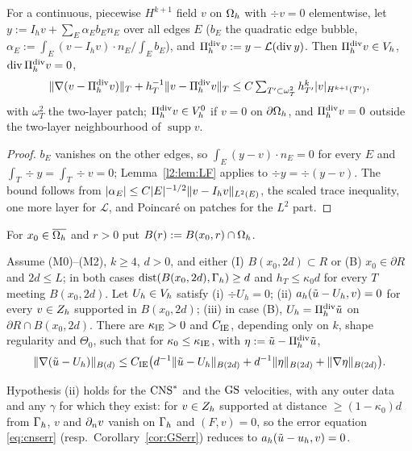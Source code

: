 \begin{lemma}\label{l2:lem:Pz}
For a continuous, piecewise $H^{k+1}$ field $v$ on $\Oh$ with $\div v=0$ elementwise, let $y:=I_hv+\sum_E\alpha_Eb_En_E$ over all edges $E$ ($b_E$ the quadratic edge bubble, $\alpha_E:=\int_E(v-I_hv)\cdot n_E/\int_Eb_E$), and $\Pi^{\rm div}_hv:=y-\mathcal L(\div y)$. Then $\Pi^{\rm div}_hv\in\Vh$, $\div\Pi^{\rm div}_hv=0$,
\[
\norm{\nabla(v-\Pi^{\rm div}_hv)}_T+h_T^{-1}\norm{v-\Pi^{\rm div}_hv}_T\le C\textstyle\sum_{T'\subset\omega^2_T}h_{T'}^k|v|_{H^{k+1}(T')},
\]
with $\omega^2_T$ the two-layer patch; $\Pi^{\rm div}_hv\in\VO$ if $v=0$ on $\partial\Oh$, and $\Pi^{\rm div}_hv=0$ outside the two-layer neighbourhood of $\operatorname{supp}v$.
\end{lemma}

\begin{proof}
$b_E$ vanishes on the other edges, so $\int_E(y-v)\cdot n_E=0$ for every $E$ and $\int_T\div y=\int_T\div v=0$; Lemma~\ref{l2:lem:LF} applies to $\div y=\div(y-v)$. The bound follows from $|\alpha_E|\le C|E|^{-1/2}\norm{v-I_hv}_{L^2(E)}$, the scaled trace inequality, one more layer for $\mathcal L$, and Poincar\'e on patches for the $L^2$ part.
\end{proof}

For $x_0\in\overline\Oh$ and $r>0$ put $B(r):=B(x_0,r)\cap\Oh$.

\begin{theorem}\label{l2:thm:IE}
Assume (M0)--(M2), $k\ge4$, $d>0$, and either (I) $B(x_0,2d)\subset R$ or (B) $x_0\in\partial R$ and $2d\le L$; in both cases $\dist(B(x_0,2d),\Gh)\ge d$ and $h_T\le\kappa_0d$ for every $T$ meeting $B(x_0,2d)$. Let $U_h\in\Vh$ satisfy (i) $\div U_h=0$; (ii) $a_h(\ut-U_h,v)=0$ for every $v\in\Zh$ supported in $B(x_0,2d)$; (iii) in case (B), $U_h=\Pi^{\rm div}_h\ut$ on $\partial R\cap B(x_0,2d)$. There are $\kappa_{\rm IE}>0$ and $C_{\rm IE}$, depending only on $k$, shape regularity and $\Theta_0$, such that for $\kappa_0\le\kappa_{\rm IE}$, with $\eta:=\ut-\Pi^{\rm div}_h\ut$,
\[
\norm{\nabla(\ut-U_h)}_{B(d)}\le C_{\rm IE}\bigl(d^{-1}\norm{\ut-U_h}_{B(2d)}+d^{-1}\norm\eta_{B(2d)}+\norm{\nabla\eta}_{B(2d)}\bigr).
\]
\end{theorem}

Hypothesis (ii) holds for the $\CNS$ and the $\GS$ velocities, with any outer data and any $\gamma$ for which they exist: for $v\in\Zh$ supported at distance $\ge(1-\kappa_0)d$ from $\Gh$, $v$ and $\dn v$ vanish on $\Gh$ and $(F,v)=0$, so the error equation \eqref{eq:cnserr} (resp.\ Corollary~\ref{cor:GSerr}) reduces to $a_h(\ut-u_h,v)=0$.

